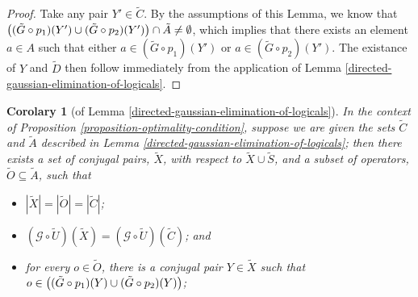\documentclass[twocolumn,showpacs,preprintnumbers,amsmath,amssymb,nofootinbib,pra,floatfix]{revtex4-1}
\newtheorem{corolary}{Corolary}
\newcommand{\set}{\tilde}
\newcommand{\genfun}{\mathcal{G}}
\begin{document}
\begin{proof}
Take any pair $Y'\in\set C$.  By the assumptions of this Lemma, we know that $\paren{(\set G\circ p_1)(Y') \cup (\set G\circ p_2)(Y')} \cap \set A \ne \emptyset$, which implies that there exists an element $a\in A$ such that either $a\in (\set G\circ p_1)(Y')$ or $a\in (\set G\circ p_2)(Y')$.  The existance of $Y$ and $\set D$ then follow immediately from the application of Lemma \ref{directed-gaussian-elimination-of-logicals}.
\end{proof}
\begin{corolary}[of Lemma \ref{directed-gaussian-elimination-of-logicals}]
\label{elimination-to-create-subset}
In the context of Proposition \ref{proposition-optimality-condition}, suppose we are given the sets $\set C$ and $\set A$ described in Lemma \ref{directed-gaussian-elimination-of-logicals};  then there exists a set of conjugal pairs, $\set X$, with respect to $\set X\cup\set S$, and a subset of operators, $\set O\subseteq \set A$, such that
\begin{itemize}
\item $|\set X|=|\set O|=|\set C|$;
\item $(\genfun\circ\set U)(\set X)=(\genfun\circ\set U)(\set C)$; and
\item for every $o\in\set O$, there is a conjugal pair $Y\in\set X$ such that $o\in\paren{(\set G\circ p_1)(Y)\cup(\set G\circ p_2)(Y)}$;
\end{itemize}
\end{corolary}
\end{document}

